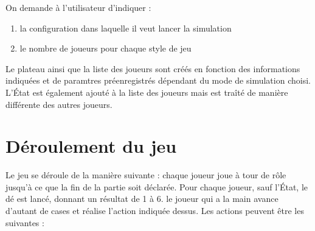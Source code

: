 \documentclass[11pt, a4paper]{report}
\begin{document}
	On demande à l'utilisateur d'indiquer :
	
	\begin{enumerate}
		
		\item la configuration dans laquelle il veut lancer la simulation
		
		\item le nombre de joueurs pour chaque style de jeu
		
	\end{enumerate}
	
	Le plateau ainsi que la liste des joueurs sont créés en fonction des informations indiquées et de paramtres préenregistrés dépendant du mode de simulation choisi. L'État est également ajouté à la liste des joueurs mais est traîté de manière différente des autres joueurs.
	
	\section{Déroulement du jeu}

	Le jeu se déroule de la manière suivante : chaque joueur joue à tour de rôle jusqu'à ce que la fin de la partie soit déclarée. Pour chaque joueur, sauf l'État, le dé est lancé, donnant un résultat de 1 à 6. le joueur qui a la main avance d'autant de cases et réalise l'action indiquée dessus. Les actions peuvent être les suivantes :
\end{document}
